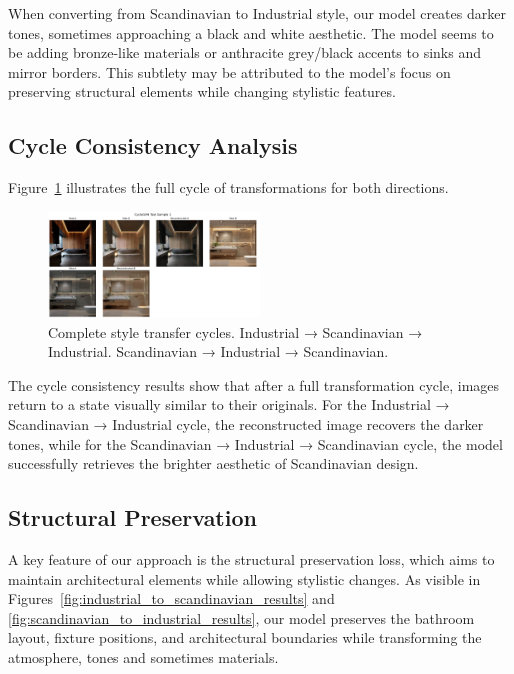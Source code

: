 \documentclass[twocolumn,superscriptaddress,aps]{revtex4-1}
\begin{document}
When converting from Scandinavian to Industrial style, our model creates darker tones, sometimes approaching a black and white aesthetic. The model seems to be adding bronze-like materials or anthracite grey/black accents to sinks and mirror borders. This subtlety may be attributed to the model's focus on preserving structural elements while changing stylistic features.

\subsection{Cycle Consistency Analysis}

Figure~\ref{fig:cycle_consistency} illustrates the full cycle of transformations for both directions.

\begin{figure}[h]
\centering
\includegraphics[width=0.5\textwidth]{assets/sample_1.png}
\caption{Complete style transfer cycles. Industrial → Scandinavian → Industrial. Scandinavian → Industrial → Scandinavian.}
\label{fig:cycle_consistency}
\end{figure}

The cycle consistency results show that after a full transformation cycle, images return to a state visually similar to their originals. For the Industrial → Scandinavian → Industrial cycle, the reconstructed image recovers the darker tones, while for the Scandinavian → Industrial → Scandinavian cycle, the model successfully retrieves the brighter aesthetic of Scandinavian design.

\subsection{Structural Preservation}

A key feature of our approach is the structural preservation loss, which aims to maintain architectural elements while allowing stylistic changes. As visible in Figures~\ref{fig:industrial_to_scandinavian_results} and \ref{fig:scandinavian_to_industrial_results}, our model preserves the bathroom layout, fixture positions, and architectural boundaries while transforming the atmosphere, tones and sometimes materials. \\
\end{document}
